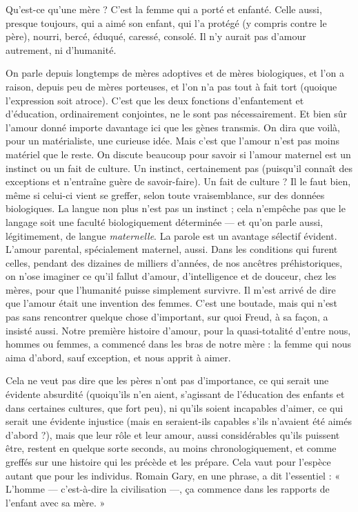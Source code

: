 Qu'est-ce qu’une mère ? C’est la femme qui a porté et enfanté. Celle aussi,
presque toujours, qui a aimé son enfant, qui l’a protégé (y compris contre le
père), nourri, bercé, éduqué, caressé, consolé. Il n’y aurait pas d’amour autrement,
ni d'humanité.

On parle depuis longtemps de mères adoptives et de mères biologiques, et
l’on a raison, depuis peu de mères porteuses, et l’on n’a pas tout à fait tort
(quoique l’expression soit atroce). C’est que les deux fonctions d’enfantement
et d'éducation, ordinairement conjointes, ne le sont pas nécessairement. Et
bien sûr l’amour donné importe davantage ici que les gènes transmis. On dira
que voilà, pour un matérialiste, une curieuse idée. Mais c’est que l’amour n’est
pas moins matériel que le reste.
On discute beaucoup pour savoir si l’amour maternel est un instinct ou un
fait de culture. Un instinct, certainement pas (puisqu’il connaît des exceptions
et n’entraîne guère de savoir-faire). Un fait de culture ? Il le faut bien, même si
celui-ci vient se greffer, selon toute vraisemblance, sur des données biologiques.
La langue non plus n’est pas un instinct ; cela n'empêche pas que le langage soit
une faculté biologiquement déterminée — et qu’on parle aussi, légitimement, de
langue {\it maternelle}. La parole est un avantage sélectif évident. L'amour parental,
spécialement maternel, aussi. Dans les conditions qui furent celles, pendant des
dizaines de milliers d’années, de nos ancêtres préhistoriques, on n’ose imaginer
ce qu'il fallut d'amour, d’intelligence et de douceur, chez les mères, pour que
l'humanité puisse simplement survivre. Il m'est arrivé de dire que l’amour était
une invention des femmes. C’est une boutade, mais qui n’est pas sans rencontrer
quelque chose d’important, sur quoi Freud, à sa façon, a insisté aussi.
Notre première histoire d’amour, pour la quasi-totalité d’entre nous, hommes
ou femmes, a commencé dans les bras de notre mère : la femme qui nous aima
d’abord, sauf exception, et nous apprit à aimer.

Cela ne veut pas dire que les pères n’ont pas d'importance, ce qui serait une
évidente absurdité (quoiqu’ils n’en aient, s’agissant de l’éducation des enfants
et dans certaines cultures, que fort peu), ni qu’ils soient incapables d’aimer, ce
qui serait une évidente injustice (mais en seraient-ils capables s’ils n'avaient été
aimés d’abord ?), mais que leur rôle et leur amour, aussi considérables qu’ils
puissent être, restent en quelque sorte seconds, au moins chronologiquement,
et comme greffés sur une histoire qui les précède et les prépare. Cela vaut pour
l'espèce autant que pour les individus. Romain Gary, en une phrase, a dit
l'essentiel : « L'homme — c’est-à-dire la civilisation —, ça commence dans les
rapports de l'enfant avec sa mère. »


